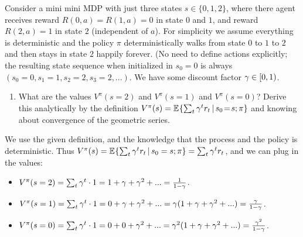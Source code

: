 

\renewcommand{\course}{Artificial Intelligence}
\renewcommand{\coursepicture}{course_ai}
\renewcommand{\coursedate}{Summer 2026}

\renewcommand{\exnum}{Exercise 5}

\exercises
{}
\exercisestitle



Consider a mini mini MDP with just three states $s\in\{0,1,2\}$, where there agent receives reward $R(0,a)=R(1,a)=0$ in state $0$ and $1$, and reward $R(2,a)=1$ in state $2$ (independent of $a$). For simplicity we assume everything is deterministic and the policy $\pi$ deterministically walks from state $0$ to $1$ to $2$ and then stays in state $2$ happily forever. (No need to define actions explicitly; the resulting state sequence when initialized in $s_0=0$ is always $(s_0=0, s_1=1, s_2=2, s_3=2, ...)$.
We have some discount factor $\gamma\in[0,1)$.

\begin{enumerate}
	\item What are the values $V^\pi(s=2)$ and $V^\pi(s=1)$ and $V^\pi(s=0)$? Derive this analytically by the definition $V^\pi(s) = \mathbb{E}_{}\!\left\{ \textstyle\sum_t \gamma^t r_t \,|\, s_0\!=\!s; \pi \right\}$ and knowing about convergence of the geometric series.
\end{enumerate}

\begin{solution}
    We use the given definition, and the knowledge that the process and the policy is deterministic. Thus
    $V^\pi(s) = \mathbb{E}_{}\!\left\{ \textstyle\sum_t \gamma^t r_t \,|\, s_0 = s ; \pi \right\} = \textstyle\sum_t \gamma^t r_t$, and we can plug in the values:

    \begin{itemize}
        \item $V^\pi(s=2) = \textstyle\sum_t \gamma^t \cdot 1 = 1 + \gamma + \gamma^2 + ... = \frac{1}{1 - \gamma}$.
        \item $V^\pi(s=1) = \textstyle\sum_t \gamma^t \cdot 1 = 0 + \gamma + \gamma^2 + ... = \gamma(1 + \gamma + \gamma^2 + ...) = \frac{\gamma}{1 - \gamma}$.
        \item $V^\pi(s=0) = \textstyle\sum_t \gamma^t \cdot 1 = 0 + 0 + \gamma^2 + ... = \gamma^2(1 + \gamma + \gamma^2 + ...) = \frac{\gamma^2}{1 - \gamma}$.
    \end{itemize}
\end{solution}



